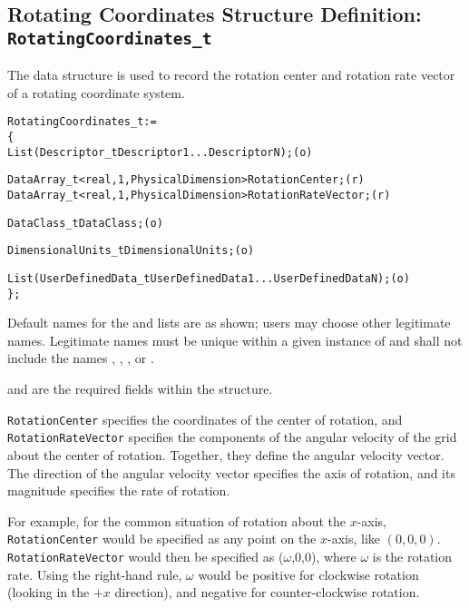 \subsection{Rotating Coordinates Structure Definition: \texttt{RotatingCoordinates\_t}}
\label{s:RotatingCoordinates}

The  data structure is used to record
the rotation center and rotation rate vector of a rotating coordinate
system.

\begin{alltt}
  RotatingCoordinates\_t :=
    \{
    List( Descriptor\_t Descriptor1 ... DescriptorN ) ;                      (o)

    DataArray\_t<real,1,PhysicalDimension> RotationCenter ;                  (r)
    DataArray\_t<real,1,PhysicalDimension> RotationRateVector ;              (r)

    DataClass\_t DataClass ;                                                 (o)

    DimensionalUnits\_t DimensionalUnits ;                                   (o)

    List( UserDefinedData\_t UserDefinedData1 ... UserDefinedDataN ) ;       (o)
    \} ;
\end{alltt}

\begin{notes}
\item Default names for the  and
       lists are as shown; users may choose
      other legitimate names.
      Legitimate names must be unique within a given instance
      of  and shall not include the names
      , , ,
      or .
\item {} and 
      are the required fields within the 
      structure.
\end{notes}

\texttt{RotationCenter} specifies the coordinates of the center of
rotation, and \texttt{RotationRateVector} specifies the components of
the angular velocity of the grid about the center of rotation.
Together, they define the angular velocity vector.
The direction of the angular velocity vector specifies the axis of
rotation, and its magnitude specifies the rate of rotation.

For example, for the common situation of rotation about the $x$-axis,
\texttt{RotationCenter} would be specified as any point on the $x$-axis,
like $(0,0,0)$.
\texttt{RotationRateVector} would then be specified as ($\omega$,0,0),
where $\omega$ is the rotation rate.
Using the right-hand rule, $\omega$ would be positive for clockwise
rotation (looking in the $+x$ direction), and negative for
counter-clockwise rotation.

